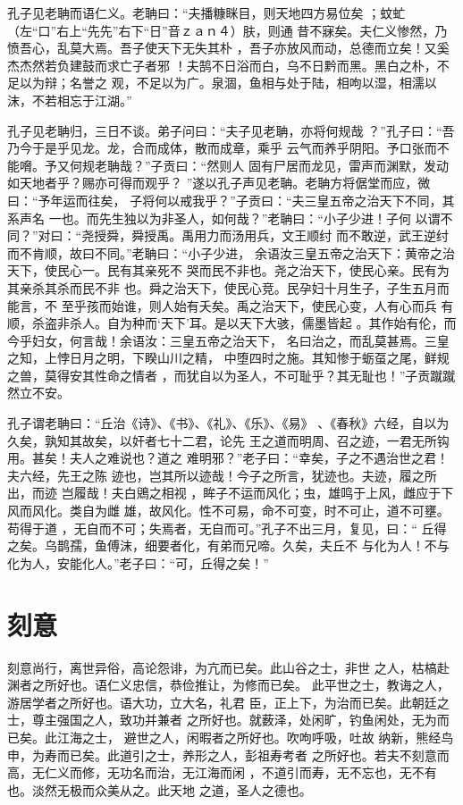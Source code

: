 \documentclass[12pt,UTF8]{ctexbook}
\begin{document}
孔子见老聃而语仁义。老聃曰：“夫播糠眯目，则天地四方易位矣 ；蚊虻（左“口”右上“先先”右下“日”音ｚａｎ４）肤，则通 昔不寐矣。夫仁义惨然，乃愤吾心，乱莫大焉。吾子使天下无失其朴 ，吾子亦放风而动，总德而立矣！又奚杰杰然若负建鼓而求亡子者邪 ！夫鹄不日浴而白，乌不日黔而黑。黑白之朴，不足以为辩；名誉之 观，不足以为广。泉涸，鱼相与处于陆，相呴以湿，相濡以沫，不若相忘于江湖。”

孔子见老聃归，三日不谈。弟子问曰：“夫子见老聃，亦将何规哉 ？”孔子曰：“吾乃今于是乎见龙。龙，合而成体，散而成章，乘乎 云气而养乎阴阳。予口张而不能嗋。予又何规老聃哉？”子贡曰：“然则人 固有尸居而龙见，雷声而渊默，发动如天地者乎？赐亦可得而观乎？ ”遂以孔子声见老聃。老聃方将倨堂而应，微曰：“予年运而往矣， 子将何以戒我乎？”子贡曰：“夫三皇五帝之治天下不同，其系声名 一也。而先生独以为非圣人，如何哉？”老聃曰：“小子少进！子何 以谓不同？”对曰：“尧授舜，舜授禹。禹用力而汤用兵，文王顺纣 而不敢逆，武王逆纣而不肯顺，故曰不同。”老聃曰：“小子少进， 余语汝三皇五帝之治天下：黄帝之治天下，使民心一。民有其亲死不 哭而民不非也。尧之治天下，使民心亲。民有为其亲杀其杀而民不非 也。舜之治天下，使民心竞。民孕妇十月生子，子生五月而能言，不 至乎孩而始谁，则人始有夭矣。禹之治天下，使民心变，人有心而兵 有顺，杀盗非杀人。自为种而‘天下’耳。是以天下大骇，儒墨皆起 。其作始有伦，而今乎妇女，何言哉！余语汝：三皇五帝之治天下， 名曰治之，而乱莫甚焉。三皇之知，上悖日月之明，下睽山川之精， 中堕四时之施。其知惨于蛎虿之尾，鲜规之兽，莫得安其性命之情者 ，而犹自以为圣人，不可耻乎？其无耻也！”子贡蹴蹴然立不安。

孔子谓老聃曰：“丘治《诗》、《书》、《礼》、《乐》、《易》 、《春秋》六经，自以为久矣，孰知其故矣，以奸者七十二君，论先 王之道而明周、召之迹，一君无所钩用。甚矣！夫人之难说也？道之 难明邪？”老子曰：“幸矣，子之不遇治世之君！夫六经，先王之陈 迹也，岂其所以迹哉！今子之所言，犹迹也。夫迹，履之所出，而迹 岂履哉！夫白鶂之相视 ，眸子不运而风化；虫，雄鸣于上风，雌应于下风而风化。类自为雌 雄，故风化。性不可易，命不可变，时不可止，道不可壅。苟得于道 ，无自而不可；失焉者，无自而可。”孔子不出三月，复见，曰：“ 丘得之矣。乌鹊孺，鱼傅沫，细要者化，有弟而兄啼。久矣，夫丘不 与化为人！不与化为人，安能化人。”老子曰：“可，丘得之矣！”

\section{刻意}

刻意尚行，离世异俗，高论怨诽，为亢而已矣。此山谷之士，非世 之人，枯槁赴渊者之所好也。语仁义忠信，恭俭推让，为修而已矣。 此平世之士，教诲之人，游居学者之所好也。语大功，立大名，礼君 臣，正上下，为治而已矣。此朝廷之士，尊主强国之人，致功并兼者 之所好也。就薮泽，处闲旷，钓鱼闲处，无为而已矣。此江海之士， 避世之人，闲暇者之所好也。吹呴呼吸，吐故 纳新，熊经鸟申，为寿而已矣。此道引之士，养形之人，彭祖寿考者 之所好也。若夫不刻意而高，无仁义而修，无功名而治，无江海而闲 ，不道引而寿，无不忘也，无不有也。淡然无极而众美从之。此天地 之道，圣人之德也。
\end{document}
